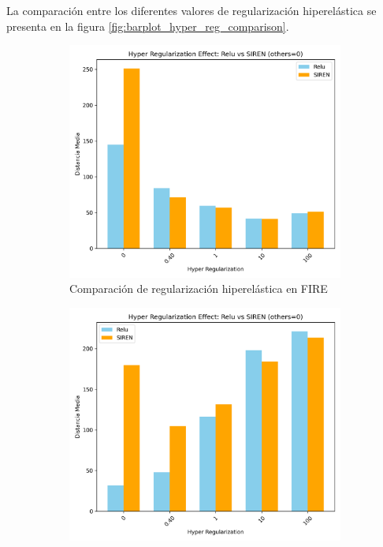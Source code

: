 La comparación entre los diferentes valores de regularización hiperelástica se presenta en la figura \ref{fig:barplot_hyper_reg_comparison}.

\begin{figure}[tbp]
    \centering
    \begin{subfigure}[b]{0.48\textwidth}
        \centering
        \includegraphics[width=\textwidth]{imaxes/reg_examples/barplot_hyper_reg_comparison_MLP_vs_SIREN_FIRE.png}
        \caption{Comparación de regularización hiperelástica en FIRE}
        \label{fig:barplot_hyper_reg_comparison_MLP_vs_SIREN_FIRE}
    \end{subfigure}\hfill
    \begin{subfigure}[b]{0.48\textwidth}
        \centering
        \includegraphics[width=\textwidth]{imaxes/reg_examples/barplot_hyper_reg_comparison_MLP_vs_SIREN_RFMID.png}

\end{subfigure}
\end{figure}

